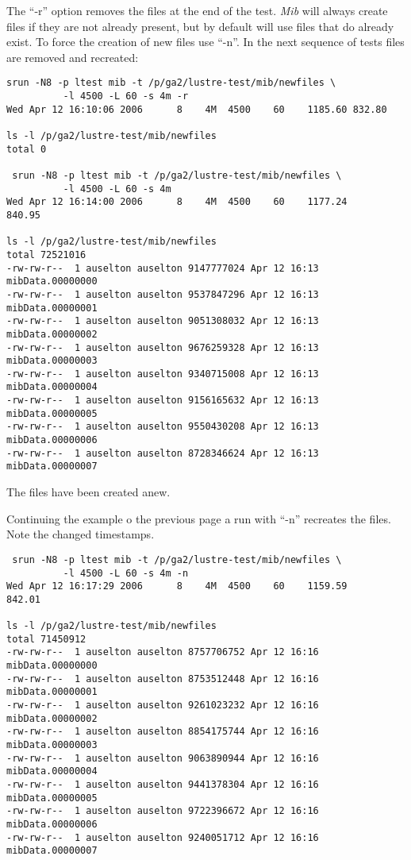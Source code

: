 \documentclass{article}
\begin{document}
The ``-r'' option removes the files at the end of the test.  {\em Mib}
will always create files if they are not already present, but by
default will use files that do already exist.  To force the creation
of new files use ``-n''.  In the next sequence of tests files are
removed and recreated:
{\small
  \begin{verbatim}
srun -N8 -p ltest mib -t /p/ga2/lustre-test/mib/newfiles \
          -l 4500 -L 60 -s 4m -r     
Wed Apr 12 16:10:06 2006      8    4M  4500    60    1185.60 832.80

ls -l /p/ga2/lustre-test/mib/newfiles
total 0

 srun -N8 -p ltest mib -t /p/ga2/lustre-test/mib/newfiles \
          -l 4500 -L 60 -s 4m
Wed Apr 12 16:14:00 2006      8    4M  4500    60    1177.24     840.95

ls -l /p/ga2/lustre-test/mib/newfiles
total 72521016
-rw-rw-r--  1 auselton auselton 9147777024 Apr 12 16:13 mibData.00000000
-rw-rw-r--  1 auselton auselton 9537847296 Apr 12 16:13 mibData.00000001
-rw-rw-r--  1 auselton auselton 9051308032 Apr 12 16:13 mibData.00000002
-rw-rw-r--  1 auselton auselton 9676259328 Apr 12 16:13 mibData.00000003
-rw-rw-r--  1 auselton auselton 9340715008 Apr 12 16:13 mibData.00000004
-rw-rw-r--  1 auselton auselton 9156165632 Apr 12 16:13 mibData.00000005
-rw-rw-r--  1 auselton auselton 9550430208 Apr 12 16:13 mibData.00000006
-rw-rw-r--  1 auselton auselton 8728346624 Apr 12 16:13 mibData.00000007
  \end{verbatim}
}
The files have been created anew.

\pagebreak
Continuing the example o the previous page a run with ``-n'' recreates
the files.  Note the changed timestamps.
{\small
  \begin{verbatim}
 srun -N8 -p ltest mib -t /p/ga2/lustre-test/mib/newfiles \
          -l 4500 -L 60 -s 4m -n
Wed Apr 12 16:17:29 2006      8    4M  4500    60    1159.59     842.01

ls -l /p/ga2/lustre-test/mib/newfiles
total 71450912
-rw-rw-r--  1 auselton auselton 8757706752 Apr 12 16:16 mibData.00000000
-rw-rw-r--  1 auselton auselton 8753512448 Apr 12 16:16 mibData.00000001
-rw-rw-r--  1 auselton auselton 9261023232 Apr 12 16:16 mibData.00000002
-rw-rw-r--  1 auselton auselton 8854175744 Apr 12 16:16 mibData.00000003
-rw-rw-r--  1 auselton auselton 9063890944 Apr 12 16:16 mibData.00000004
-rw-rw-r--  1 auselton auselton 9441378304 Apr 12 16:16 mibData.00000005
-rw-rw-r--  1 auselton auselton 9722396672 Apr 12 16:16 mibData.00000006
-rw-rw-r--  1 auselton auselton 9240051712 Apr 12 16:16 mibData.00000007
  \end{verbatim}
}
\end{document}
